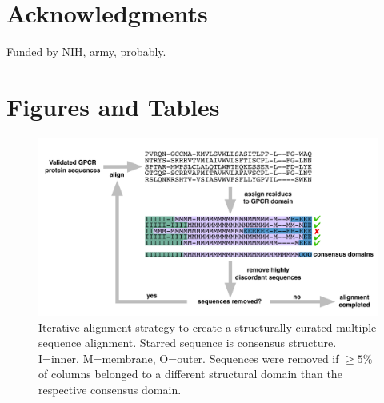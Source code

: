 \documentclass[fleqn,10pt]{wlpeerj}
\begin{document}
\section*{Acknowledgments}

Funded by NIH, army, probably.




\newpage


\section*{Figures and Tables}

\vspace{3cm}

\begin{figure}[htbp]
	\centerline{\includegraphics[width=18cm]{figures/alignment_flowchart.pdf}}
	\caption{\label{flowchart} Iterative alignment strategy to create a structurally-curated multiple sequence alignment. Starred sequence is consensus structure. I=inner, M=membrane, O=outer. Sequences were removed if $\geq 5\%$ of columns belonged to a different structural domain than the respective consensus domain.}
\end{figure}


\newpage
\end{document}
